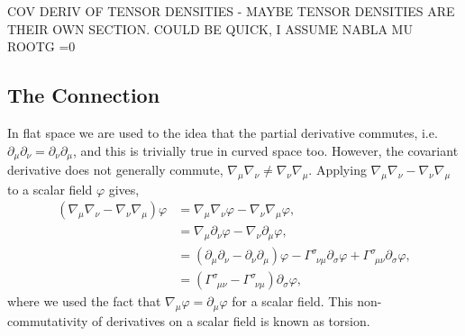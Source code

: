 COV DERIV OF TENSOR DENSITIES - MAYBE TENSOR DENSITIES ARE THEIR OWN SECTION. COULD BE QUICK, I ASSUME NABLA MU ROOTG =0


\subsection{The Connection}\label{intro:sec:levicivita}

In flat space we are used to the idea that the partial derivative commutes, i.e. $\partial_\mu \partial_\nu = \partial_\nu \partial_\mu$, and this is trivially true in curved space too. However, the covariant derivative does not generally commute, $\nabla_\mu \nabla_\nu \neq \nabla_\nu \nabla_\mu$. Applying $\nabla_\mu \nabla_\nu - \nabla_\nu \nabla_\mu$ to a scalar field $\varphi$ gives,
\begin{align}
(\nabla_\mu \nabla_\nu  - \nabla_\nu \nabla_\mu )\varphi &= \nabla_\mu \nabla_\nu \varphi - \nabla_\nu \nabla_\mu \varphi , \\
                                               &= \nabla_\mu \partial_\nu \varphi - \nabla_\nu \partial_\mu \varphi , \\
                                               &= (\partial_\mu \partial_\nu  - \partial_\nu \partial_\mu )\varphi -  \Gamma^{\sigma}_{\,\,\,\nu\mu} \partial_\sigma \varphi + \Gamma^{\sigma}_{\,\,\,\mu\nu} \partial_\sigma \varphi,\\ 
                                               &=(\Gamma^{\sigma}_{\,\,\,\mu\nu}  - \Gamma^{\sigma}_{\,\,\,\nu\mu}) \partial_\sigma \varphi, 
\end{align}
where we used the fact that $\nabla_\mu \varphi = \partial_\mu \varphi$ for a scalar field. This non-commutativity of derivatives on a scalar field is known as torsion. 

